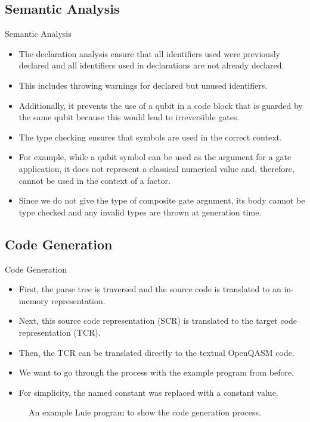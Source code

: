 \subsection{Semantic Analysis}
\begin{frame}{Semantic Analysis}
    \begin{itemize}
        \item The declaration analysis ensure that all identifiers used were previously declared and all identifiers used in declarations are not already declared.
        \item This includes throwing warnings for declared but unused identifiers.
        \item Additionally, it prevents the use of a qubit in a code block that is guarded by the same qubit because this would lead to irreversible gates.
        \item The type checking ensures that symbols are used in the correct context.
        \item For example, while a qubit symbol can be used as the argument for a gate application, it does not represent a classical numerical value and, therefore, cannot be used in the context of a factor.
        \item Since we do not give the type of composite gate argument, its body cannot be type checked and any invalid types are thrown at generation time. 
    \end{itemize}
\end{frame}

\subsection{Code Generation}
\begin{frame}{Code Generation}
    \begin{itemize}
        \item First, the parse tree is traversed and the source code is translated to an in-memory representation.
        \item Next, this source code representation (SCR) is translated to the target code representation (TCR).
        \item Then, the TCR can be translated directly to the textual OpenQASM code.
        \item We want to go through the process with the example program from before.
        \item For simplicity, the named constant was replaced with a constant value.
    \end{itemize}
    \begin{figure}
        \centering
        
        \caption{An example Luie program to show the code generation process.}
    \end{figure}
\end{frame}

